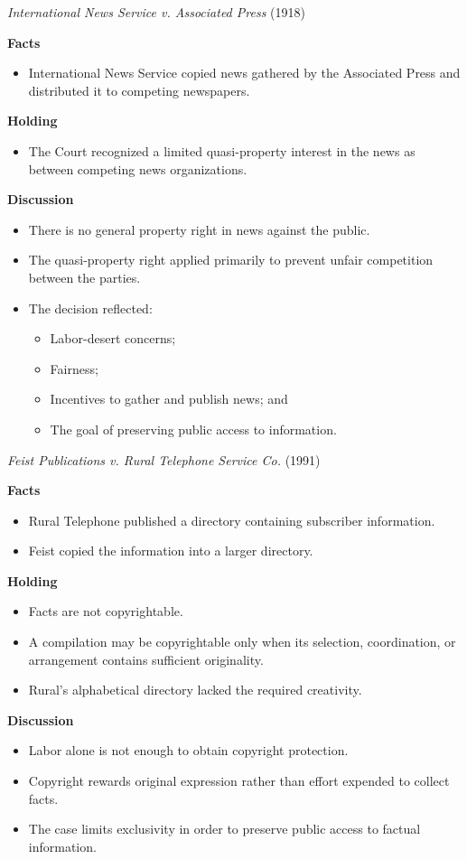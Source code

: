 \documentclass[11pt]{tex/lawoutline}
\begin{document}
\casebox
{\textit{International News Service v. Associated Press} (1918)}
{}
{
\textbf{Facts}
\begin{itemize}
    \item International News Service copied news gathered by the Associated Press and distributed it to competing newspapers.
\end{itemize}

\textbf{Holding}
\begin{itemize}
    \item The Court recognized a limited quasi-property interest in the news as between competing news organizations.
\end{itemize}

\textbf{Discussion}
\begin{itemize}
    \item There is no general property right in news against the public.
    \item The quasi-property right applied primarily to prevent unfair competition between the parties.
    \item The decision reflected:
    \begin{itemize}
        \item Labor-desert concerns;
        \item Fairness;
        \item Incentives to gather and publish news; and
        \item The goal of preserving public access to information.
    \end{itemize}
\end{itemize}
}

\casebox
{\textit{Feist Publications v. Rural Telephone Service Co.} (1991)}
{}
{
\textbf{Facts}
\begin{itemize}
    \item Rural Telephone published a directory containing subscriber information.
    \item Feist copied the information into a larger directory.
\end{itemize}

\textbf{Holding}
\begin{itemize}
    \item Facts are not copyrightable.
    \item A compilation may be copyrightable only when its selection, coordination, or arrangement contains sufficient originality.
    \item Rural's alphabetical directory lacked the required creativity.
\end{itemize}

\textbf{Discussion}
\begin{itemize}
    \item Labor alone is not enough to obtain copyright protection.
    \item Copyright rewards original expression rather than effort expended to collect facts.
    \item The case limits exclusivity in order to preserve public access to factual information.
\end{itemize}
}
\end{document}
